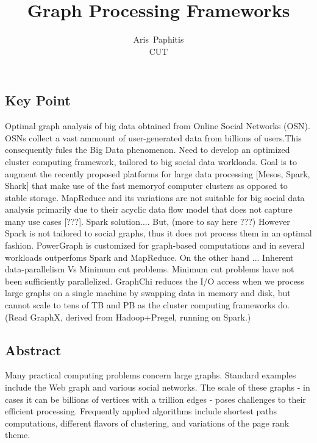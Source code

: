 \documentclass[letterpaper,twocolumn,10pt]{article}
\begin{document}
\date{}

\title{\Large \bf Graph Processing Frameworks}
\author{
{\rm Aris\ Paphitis}\\
CUT
} %

\maketitle

\thispagestyle{empty}


\subsection*{Key Point}
Optimal graph analysis of big data obtained from Online Social Networks (OSN). OSNs collect a vast ammount of user-generated data from billions of users.This consequently fules the Big Data phenomenon. 
Need to develop an optimized cluster computing framework, tailored to big social data workloads.
Goal is to augment the recently proposed platforms for large data processing [Mesos, Spark, Shark] that make use of the fast memoryof computer clusters as opposed to stable storage.
MapReduce and its variations are not suitable for big social data analysis primarily due to their acyclic data flow model that does not capture many use cases [???].
Spark solution....
But, (more to say here ???)
However Spark is not tailored to social graphs, thus it does not process them in an optimal fashion. PowerGraph is customized for graph-based computations and in several workloads outperfoms Spark and MapReduce. On the other hand ... Inherent data-parallelism Vs Minimum cut problems. Minimum cut problems have not been sufficiently parallelized.
GraphChi reduces the I/O access when we process large graphs on a single machine by swapping data in memory and disk, but cannot scale to tens of TB and PB as the cluster computing frameworks do.
(Read GraphX, derived from Hadoop+Pregel, running on Spark.)

\subsection{Abstract}
Many practical computing problems concern large graphs. Standard examples include the Web graph and various social networks. The scale of these graphs - in cases it can be billions of vertices with a trillion edges - poses challenges to their efficient processing.
Frequently applied algorithms include shortest paths computations, different flavors of clustering, and variations of the page rank theme.
\end{document}

